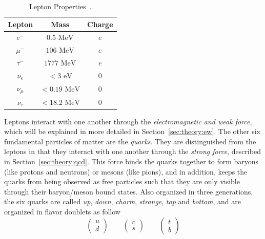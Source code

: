 \begin{table}[h!]
\begin{center}
\begin{tabular}{|c|c|c|}%
\hline
Lepton        & Mass           & Charge \\%
\hline
$e^{-}$      & $0.5 \mbox{ MeV}$      & $e$ \\%
$\mu^{-}$    & $106 \mbox{ MeV}$      & $e$ \\%
$\tau^{-}$   & $1777 \mbox{ MeV}$     & $e$ \\%
\hline                                      
$\nu_{e}$    & $< 3 \mbox{ eV}$       & $0$ \\%
$\nu_{\mu}$  & $< 0.19 \mbox{ MeV}$   & $0$ \\%
$\nu_{\tau}$ & $< 18.2 \mbox{ MeV}$   & $0$  \\%
\hline
\end{tabular}
\end{center}
\caption{Lepton Properties~\cite{Patrignani:2016xqp}.}
\label{table:theory:lepprop}
\end{table}
Leptons interact with one another through the \emph{electromagnetic and weak force}, which will be explained in more detailed in Section~\ref{sec:theory:ew}.\newline
The other six fundamental particles of matter are the \emph{quarks}. They are distinguished from the leptons in that they interact with one another through the \emph{strong force}, described in Section~\ref{sec:theory:qcd}. This force binds the quarks together to form baryons (like protons and neutrons) or mesons (like pions), and in addition, keeps the quarks from being observed as free particles such that they are only visible through their baryon/meson bound states. Also organized in three generations, the six quarks are called \textit{up}, \textit{down}, \textit{charm}, \textit{strange}, \textit{top} and \textit{bottom}, and are organized in flavor doublets as follow
\begin{equation}
\label{eqn:quark_flavor_doublets}
\begin{pmatrix} u \\ d \end{pmatrix} \qquad
\begin{pmatrix} c \\ s \end{pmatrix} \qquad
\begin{pmatrix} t \\ b \end{pmatrix}
\end{equation}
